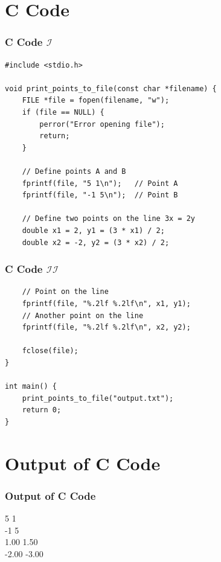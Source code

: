 \documentclass{beamer}
\theoremstyle{remark}
\numberwithin{equation}{section}
\begin{document}
\section{C Code}
\begin{frame}[fragile]
\frametitle{C Code $\mathcal{I}$}
\begin{verbatim}
#include <stdio.h>

void print_points_to_file(const char *filename) {
    FILE *file = fopen(filename, "w");
    if (file == NULL) {
        perror("Error opening file");
        return;
    }

    // Define points A and B
    fprintf(file, "5 1\n");   // Point A
    fprintf(file, "-1 5\n");  // Point B

    // Define two points on the line 3x = 2y
    double x1 = 2, y1 = (3 * x1) / 2;
    double x2 = -2, y2 = (3 * x2) / 2;
\end{verbatim}
\end{frame}
\begin{frame}[fragile]
\frametitle{C Code $\mathcal{II}$}
\begin{verbatim}
    // Point on the line
    fprintf(file, "%.2lf %.2lf\n", x1, y1); 
    // Another point on the line
    fprintf(file, "%.2lf %.2lf\n", x2, y2);  

    fclose(file);
}

int main() {
    print_points_to_file("output.txt");
    return 0;
}
\end{verbatim}
\end{frame}
\section{Output of C Code}
\begin{frame}[fragile]
\frametitle{Output of C Code}
5 1\\
-1 5\\
1.00 1.50\\
-2.00 -3.00\\
\end{frame}
\end{document}
